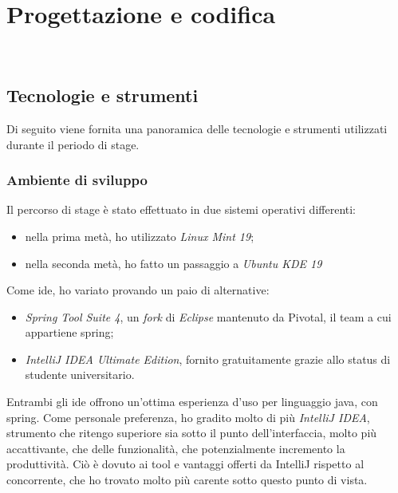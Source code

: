 
\chapter{Progettazione e codifica}
\label{cap:progettazione-codifica}

\\ %

\section{Tecnologie e strumenti}
\label{sec:tecnologie-strumenti}

Di seguito viene fornita una panoramica delle tecnologie e strumenti utilizzati durante il periodo di stage.


\subsection{Ambiente di sviluppo}
Il percorso di stage è stato effettuato in due sistemi operativi differenti:
\begin{itemize}
	\item nella prima metà, ho utilizzato \textit{Linux Mint 19};
	\item nella seconda metà, ho fatto un passaggio a \textit{Ubuntu KDE 19}
\end{itemize}

Come \acrshort{ide}, ho variato provando un paio di alternative:
\begin{itemize}
	\item \textit{Spring Tool Suite 4}, un \textit{fork} di \textit{Eclipse} mantenuto da Pivotal, il team a cui appartiene \gls{spring};
	\item \textit{IntelliJ IDEA Ultimate Edition}, fornito gratuitamente grazie allo status di studente universitario.
\end{itemize} 

Entrambi gli \acrshort{ide} offrono un'ottima esperienza d'uso per linguaggio \gls{java}, con \gls{spring}.
Come personale preferenza, ho gradito molto di più \textit{IntelliJ IDEA}, strumento che ritengo superiore sia sotto il punto dell'interfaccia, molto più accattivante, che delle funzionalità, che potenzialmente incremento la produttività. Ciò è dovuto ai tool e vantaggi offerti da IntelliJ rispetto al concorrente, che ho trovato molto più carente sotto questo punto di vista.

